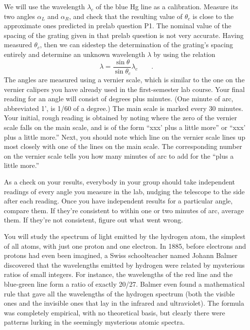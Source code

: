 We will use the wavelength $\lambda_c$ of the blue Hg line as a calibration. Measure its two
angles $\alpha_L$ and $\alpha_R$, and check that the resulting value of $\theta_c$ is
close to the approximate ones predicted in prelab question P1. The nominal value of the
spacing of the grating given in that prelab question is not very accurate.
Having measured $\theta_c$,
then we can sidestep the determination of the grating's spacing entirely 
and determine an unknown wavelength $\lambda$
by using the relation
\begin{equation*}
  \lambda = \frac{\sin\theta}{\sin\theta_c} \lambda_c \qquad .
\end{equation*}
The angles are measured using a vernier scale, which
is similar to the one on the vernier calipers you have
already used in the first-semester lab course. Your final
reading for an angle will consist of degrees plus minutes.
(One minute of arc, abbreviated 1', is 1/60 of a degree.)
The main scale is marked every 30 minutes. Your initial,
rough reading is obtained by noting where the zero of the
vernier scale falls on the main scale, and is of the form
``xxx' plus a little more'' or ``xxx'
plus a little more.'' Next, you should note which line on
the vernier scale lines up most closely with one of the
lines on the main scale. The corresponding number on the
vernier scale tells you how many minutes of arc to add for
the ``plus a little more.''

As a check on your results,
everybody in your group should take independent readings of every
angle you measure in the lab, nudging the telescope to the side after
each reading. Once you have independent results for a particular angle,
compare them. If they're consistent to within one or two minutes of
arc, average them. If they're not consistent, figure out what went
wrong.


You will study the spectrum of light emitted by
the hydrogen atom, the simplest of all atoms, with just one
proton and one electron. In 1885, before electrons and
protons had even been imagined, a Swiss schoolteacher named
Johann Balmer discovered that the wavelengths emitted by
hydrogen were related by mysterious ratios of small
integers. For instance, the wavelengths of the red line and
the blue-green line form a ratio of exactly 20/27. Balmer
even found a mathematical rule that gave all the wavelengths
of the hydrogen spectrum (both the visible ones and the
invisible ones that lay in the infrared and ultraviolet).
The formula was completely empirical, with no theoretical
basis, but clearly there were patterns lurking in the
seemingly mysterious atomic spectra.

